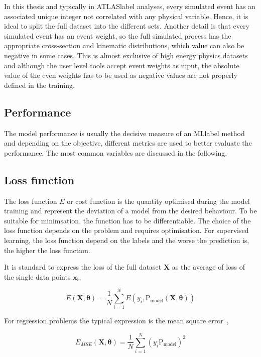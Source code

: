 In this thesis and typically in \acrshort{ATLASlabel} analyses, every simulated event has an associated unique integer not correlated with any physical variable. Hence, it is ideal to split the full dataset into the different sets. Another detail is that every simulated event has an event weight, so the full simulated process has the appropriate cross-section and kinematic distributions, which value can also be negative in some cases. This is almost exclusive of high energy physics datasets and although the user level tools accept event weights as input, the absolute value of the even weights has to be used as negative values are not properly defined in the training. 

\subsection{Performance}

The model performance is usually the decisive measure of an \acrshort{MLlabel} method and depending on the objective, different metrics are used to better evaluate the performance. The most common variables are discussed in the following.

\subsection{Loss function}

The loss function $E$ or cost function is the quantity optimised during the model training and represent the deviation of a model from the desired behaviour. To be suitable for minimsation, the function has to be differentiable. The choice of the loss function depends on the problem and requires optimisation. For supervised learning, the loss function depend on the labels and the worse the prediction is, the higher the loss function.

It is standard to express the loss of the full dataset $\mathbf{X}$ as the average of loss of the single data points $\mathbf{x_i}$,

\begin{equation}
    E(\mathbf{X},\boldsymbol{\theta})=\frac{1}{N}\sum_{i=1}^NE(y_i,\text{P}_\text{model}(\mathbf{X},\boldsymbol{\theta}))
\end{equation}

For regression problems the typical expression is the mean square error~\cite{EncyclopediaofML}, 

\begin{equation}
    E_{MSE}(\mathbf{X},\boldsymbol{\theta}) = \frac{1}{N}\sum_{i=1}^N (y_i\text{P}_\text{model})^2
\end{equation}

